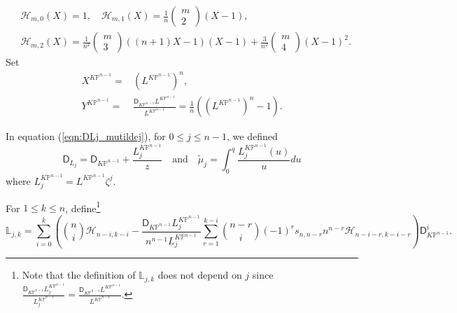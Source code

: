 \documentclass[12pt]{amsart}
\numberwithin{equation}{section}
\newcommand{\KP}{K\mathbb{P}}
\begin{document}
\begin{equation*}
\begin{aligned}
& \mathcal{H}_{m, 0}(X)=1, \quad \mathcal{H}_{m, 1}(X)=\frac{1}{n}\left(\begin{array}{c}
m \\
2
\end{array}\right)(X-1), \\
& \mathcal{H}_{m, 2}(X)=\frac{1}{n^2}\left(\begin{array}{c}
m \\
3
\end{array}\right)((n+1) X-1)(X-1)+\frac{3}{n^2}\left(\begin{array}{c}
m \\
4
\end{array}\right)(X-1)^2 .
\end{aligned}
\end{equation*}
Set 
\begin{equation}\label{eqn:XandY}
\begin{split}
X^{\KP^{n-1}}=&(L^{\KP^{n-1}})^n,\\
Y^{\KP^{n-1}}=&\frac{\mathsf{D}_{\KP^{n-1}}L^{\KP^{n-1}}}{L^{\KP^{n-1}}}=\frac{1}{n}\left((L^{\KP^{n-1}})^n-1 \right).
\end{split}
\end{equation}

In equation (\ref{eqn:DLj_mutildej}), for $0\leq j \leq n-1$, we defined
\begin{equation*}
\mathsf{D}_{L_j}=\mathsf{D}_{\KP^{n-1}}+\frac{L^{\KP^{n-1}}_j}{z} \quad\text{and}\quad \widetilde{\mu}_j=\int_0^q\frac{L^{\KP^{n-1}}_j(u)}{u}du
\end{equation*}
where $L_j^{\KP^{n-1}}=L^{\KP^{n-1}}\zeta^j$.

For $1\leq k \leq n$, define\footnote{Note that the definition of $\mathds{L}_{j,k}$ does not depend on $j$ since $\frac{\mathsf{D}_{\KP^{n-1}}L_j^{\KP^{n-1}}}{L_j^{\KP^{n-1}}}=\frac{\mathsf{D}_{\KP^{n-1}}L^{\KP^{n-1}}}{L^{\KP^{n-1}}}.$}
\begin{equation}\label{eqn:mathdsLjk}
\mathds{L}_{j,k}=\sum_{i=0}^{k}\left(\binom{n}{i} \mathcal{H}_{n-i, k-i}-\frac{\mathsf{D}_{\KP^{n-1}}L_j^{\KP^{n-1}}}{n^{n-1}L_j^{\KP^{n-1}}} \sum_{r=1}^{k-i}\binom{n-r}{i} (-1)^r s_{n, n-r}n^{n-r} \mathcal{H}_{n-i-r, k-i-r}\right) \mathsf{D}_{\KP^{n-1}}^{i}.
\end{equation}
\end{document}
